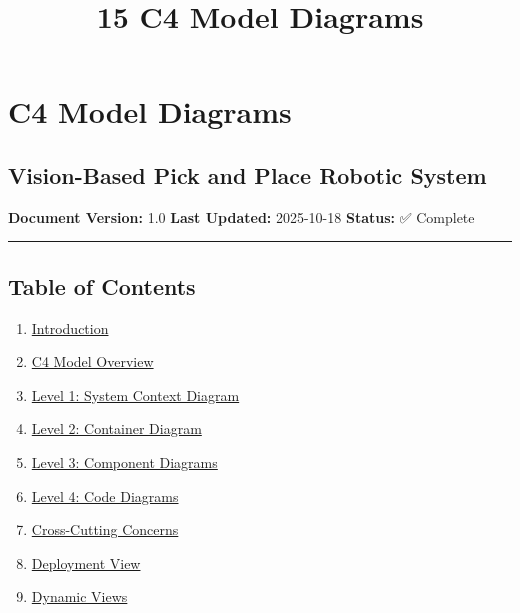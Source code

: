 \documentclass[
]{article}
\title{15 C4 Model Diagrams}
\author{}
\date{}
\providecommand{\tightlist}{%
  \setlength{\itemsep}{0pt}\setlength{\parskip}{0pt}}
\begin{document}
\maketitle

{
\setcounter{tocdepth}{3}
\tableofcontents
}
\hypertarget{c4-model-diagrams}{%
\section{C4 Model Diagrams}\label{c4-model-diagrams}}

\hypertarget{vision-based-pick-and-place-robotic-system}{%
\subsection{Vision-Based Pick and Place Robotic
System}\label{vision-based-pick-and-place-robotic-system}}

\textbf{Document Version:} 1.0 \textbf{Last Updated:} 2025-10-18
\textbf{Status:} ✅ Complete

\begin{center}\rule{0.5\linewidth}{0.5pt}\end{center}

\hypertarget{table-of-contents}{%
\subsection{Table of Contents}\label{table-of-contents}}

\begin{enumerate}
\def\labelenumi{\arabic{enumi}.}
\tightlist
\item
  \protect\hyperlink{1-introduction}{Introduction}
\item
  \protect\hyperlink{2-c4-model-overview}{C4 Model Overview}
\item
  \protect\hyperlink{3-level-1-system-context-diagram}{Level 1: System
  Context Diagram}
\item
  \protect\hyperlink{4-level-2-container-diagram}{Level 2: Container
  Diagram}
\item
  \protect\hyperlink{5-level-3-component-diagrams}{Level 3: Component
  Diagrams}
\item
  \protect\hyperlink{6-level-4-code-diagrams}{Level 4: Code Diagrams}
\item
  \protect\hyperlink{7-cross-cutting-concerns}{Cross-Cutting Concerns}
\item
  \protect\hyperlink{8-deployment-view}{Deployment View}
\item
  \protect\hyperlink{9-dynamic-views}{Dynamic Views}
\end{enumerate}
\end{document}
